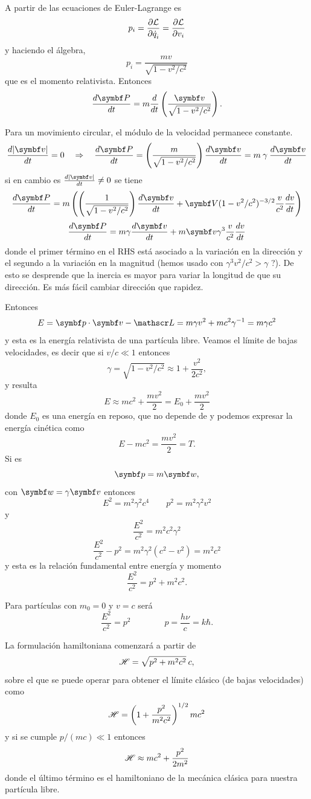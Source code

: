 \documentclass[10pt,oneside]{CBFT_book}
\begin{document}
A partir de las ecuaciones de Euler-Lagrange es 
\[
	p_i = \frac{\partial^{\hspace{-0.05em}} {\mathcal{L}}}{\partial {\dot{q}_i}^{\hspace{-0.05em}}} = \frac{\partial^{\hspace{-0.05em}} {\mathcal{L}}}{\partial {v_i}^{\hspace{-0.05em}}}
\]
y haciendo el álgebra,
\[
	p_i = \frac{ m v }{\sqrt{ 1 - v^2/c^2 }}
\]
que es el momento relativista. Entonces
\[
	\dtot{\vb{P}}{t} = m \dtot{}{t}\left( \frac{\vb{v}}{\sqrt{1 - v^2/c^2 }}\right).
\]

Para un movimiento circular, el módulo de la velocidad permanece constante.
\[
	\dtot{|\vb{v}|}{t} = 0 \quad \Rightarrow \quad \dtot{\vb{P}}{t} =
		\left( \frac{ m }{\sqrt{1 - v^2/c^2 }}\right) \dtot{\vb{v}}{t} =
		m \: \gamma \: \dtot{\vb{v}}{t}
\]
si en cambio es $ \dtot{|\vb{v}|}{t} \neq 0 $ se tiene 
\[
	\dtot{\vb{P}}{t} = m \left( \left( \frac{ 1 }{\sqrt{1 - v^2/c^2 }}\right) \dtot{\vb{v}}{t} 
	+ \vb{V} (1 - v^2/c^2)^{-3/2} \frac{v}{c^2} \dtot{v}{t} \right)
\]
\[
	\dtot{\vb{P}}{t} = m \gamma \dtot{\vb{v}}{t} + m \vb{v} \gamma^3 \frac{v}{c^2} \dtot{v}{t}
\]
donde el primer término en el RHS está asociado a la variación en la dirección y el segundo a la variación
en la magnitud (hemos usado con $ \gamma^3 v^2/c^2 > \gamma $ ?). De esto se desprende que la inercia es
mayor para variar la longitud de  que su dirección. Es más fácil cambiar dirección que rapidez.

Entonces
\[
	E = \pe{p}{v} - \Lag = m \gamma v^2 + m c^2 \gamma^{-1} = m \gamma c^2
\]
y esta es la energía relativista de una partícula libre. Veamos el límite de bajas velocidades, es decir
que si $v/c \ll 1$ entonces 
\[
	\gamma = \sqrt{ 1 - v^2/c^2 } \approx 1 + \frac{v^2}{2c^2},
\]
y resulta 
\[
	E \approx  m c^2 + \frac{m v^2}{2} = E_0 + \frac{m v^2}{2}
\]
donde $E_0$ es una energía en reposo, que no depende de  y podemos expresar la energía cinética como 
\[
	E - m c^2 = \frac{m v^2}{2} = T.
\]
Si es 
\[
	\vb{p} = m \vb{w},
\]
con $\vb{w} = \gamma \vb{v}$ entonces 
\[
	E^2 = m^2 \gamma^2 c^4 \qquad p^2 = m^2 \gamma^2 v^2 
\]
y
\[
	\frac{E^2}{c^2} = m^2 c^2 \gamma^2
\]
\[
	\frac{E^2}{c^2} - p^2 = m^2 \gamma^2 (c^2 -v^2) = m^2 c^2
\]
y esta es la relación fundamental entre energía y momento 
\[
	\frac{E^2}{c^2} = p^2 + m^2c^2.
\]

Para partículas con $m_0 = 0$ y $v=c$ será 
\[
	\frac{E^2}{c^2} = p^2 \qquad \qquad p = \frac{h\nu}{c} = k\hbar.
\]

La formulación hamiltoniana comenzará a partir de 
\[
	\mathscr{H} = \sqrt{ p^2 + m^2 c^2} \: c,
\]
sobre el que se puede operar para obtener el límite clásico (de bajas velocidades) como 
\[
	\mathscr{H} = \left( 1 + \frac{ p^2 }{ m^2 c^2 } \right)^{1/2} m c^2
\]
y si se cumple $ p/(mc) \ll 1$ entonces 
\[
	\mathscr{H} \approx mc^2 + \frac{ p^2 }{2m^2}
\]
donde el último término  es el hamiltoniano de la mecánica clásica para nuestra partícula
libre.
\end{document}
